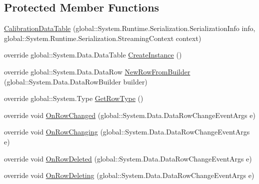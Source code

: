 \subsection*{Protected Member Functions}
\begin{DoxyCompactItemize}
\item 
\hyperlink{class_env_int_1_1_win32_1_1_field_tech_1_1_manager_1_1_data_sets_1_1_guide_ware_mobile_data_set_1_1_calibration_data_table_aee73c937e823abfecd360abe5628a1f6}{Calibration\+Data\+Table} (global\+::\+System.\+Runtime.\+Serialization.\+Serialization\+Info info, global\+::\+System.\+Runtime.\+Serialization.\+Streaming\+Context context)
\item 
override global\+::\+System.\+Data.\+Data\+Table \hyperlink{class_env_int_1_1_win32_1_1_field_tech_1_1_manager_1_1_data_sets_1_1_guide_ware_mobile_data_set_1_1_calibration_data_table_a2c941f5945959302f3eb4aafe6758c40}{Create\+Instance} ()
\item 
override global\+::\+System.\+Data.\+Data\+Row \hyperlink{class_env_int_1_1_win32_1_1_field_tech_1_1_manager_1_1_data_sets_1_1_guide_ware_mobile_data_set_1_1_calibration_data_table_adcb904b6ae18c9827955d75fa0619298}{New\+Row\+From\+Builder} (global\+::\+System.\+Data.\+Data\+Row\+Builder builder)
\item 
override global\+::\+System.\+Type \hyperlink{class_env_int_1_1_win32_1_1_field_tech_1_1_manager_1_1_data_sets_1_1_guide_ware_mobile_data_set_1_1_calibration_data_table_a02c09718810a0fd3793639bb7c8a7c57}{Get\+Row\+Type} ()
\item 
override void \hyperlink{class_env_int_1_1_win32_1_1_field_tech_1_1_manager_1_1_data_sets_1_1_guide_ware_mobile_data_set_1_1_calibration_data_table_a3186e701b3970cd5966f60b3cd54180f}{On\+Row\+Changed} (global\+::\+System.\+Data.\+Data\+Row\+Change\+Event\+Args e)
\item 
override void \hyperlink{class_env_int_1_1_win32_1_1_field_tech_1_1_manager_1_1_data_sets_1_1_guide_ware_mobile_data_set_1_1_calibration_data_table_af20aa02f6895ae82c8bdff853c0b6d45}{On\+Row\+Changing} (global\+::\+System.\+Data.\+Data\+Row\+Change\+Event\+Args e)
\item 
override void \hyperlink{class_env_int_1_1_win32_1_1_field_tech_1_1_manager_1_1_data_sets_1_1_guide_ware_mobile_data_set_1_1_calibration_data_table_ae3dceb58016dd7b4a361cc0b22d07048}{On\+Row\+Deleted} (global\+::\+System.\+Data.\+Data\+Row\+Change\+Event\+Args e)
\item 
override void \hyperlink{class_env_int_1_1_win32_1_1_field_tech_1_1_manager_1_1_data_sets_1_1_guide_ware_mobile_data_set_1_1_calibration_data_table_a6d00f3f72f3520fbd758eac9a1ec1e8b}{On\+Row\+Deleting} (global\+::\+System.\+Data.\+Data\+Row\+Change\+Event\+Args e)

\end{DoxyCompactItemize}
